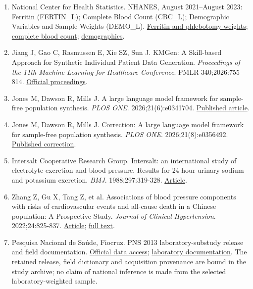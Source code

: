 \documentclass[11pt,letterpaper]{article}
\begin{document}
\begin{enumerate}[label=\arabic*.,leftmargin=2.1em,itemsep=.2em,parsep=0pt]
\item National Center for Health Statistics. NHANES, August 2021–\allowbreak{}August 2023: Ferritin (FERTIN\_L); Complete Blood Count (CBC\_L); Demographic Variables and Sample Weights (DEMO\_L). \href{https://wwwn.cdc.gov/Nchs/Data/Nhanes/Public/2021/DataFiles/FERTIN\_L.htm}{Ferritin and phlebotomy weights}; \href{https://wwwn.cdc.gov/Nchs/Data/Nhanes/Public/2021/DataFiles/CBC\_L.htm}{complete blood count}; \href{https://wwwn.cdc.gov/Nchs/Data/Nhanes/Public/2021/DataFiles/DEMO\_L.htm}{demographics}.

\item Jiang J, Gao C, Rasmussen E, Xie SZ, Sun J. KMGen: A Skill-based Approach for Synthetic Individual Patient Data Generation. \emph{Proceedings of the 11th Machine Learning for Healthcare Conference}. PMLR 340;2026:755–\allowbreak{}814. \href{https://proceedings.mlr.press/v340/jiang26a.html}{Official proceedings}.

\item Jones M, Dawson R, Mills J. A large language model framework for sample-free population synthesis. \emph{PLOS ONE}. 2026;21(6):e0341704. \href{https://journals.plos.org/plosone/article?id=10.1371/journal.pone.0341704}{Published article}.

\item Jones M, Dawson R, Mills J. Correction: A large language model framework for sample-free population synthesis. \emph{PLOS ONE}. 2026;21(8):e0356492. \href{https://journals.plos.org/plosone/article?id=10.1371/journal.pone.0356492}{Published correction}.

\item Intersalt Cooperative Research Group. Intersalt: an international study of electrolyte excretion and blood pressure. Results for 24 hour urinary sodium and potassium excretion. \emph{BMJ}. 1988;297:319-328. \href{https://doi.org/10.1136/bmj.297.6644.319}{Article}.

\item Zhang Z, Gu X, Tang Z, et al. Associations of blood pressure components with risks of cardiovascular events and all-cause death in a Chinese population: A Prospective Study. \emph{Journal of Clinical Hypertension}. 2022;24:825-837. \href{https://doi.org/10.1111/jch.14529}{Article}; \href{https://pmc.ncbi.nlm.nih.gov/articles/PMC9278591/}{full text}.

\item Pesquisa Nacional de Saúde, Fiocruz. PNS 2013 laboratory-substudy release and field documentation. \href{https://www.pns.icict.fiocruz.br/bases-de-dados/}{Official data access}; \href{https://www.pns.icict.fiocruz.br/exames-laboratoriais/}{laboratory documentation}. The retained release, field dictionary and acquisition provenance are bound in the study archive; no claim of national inference is made from the selected laboratory-weighted sample.

\end{enumerate}
\end{document}
